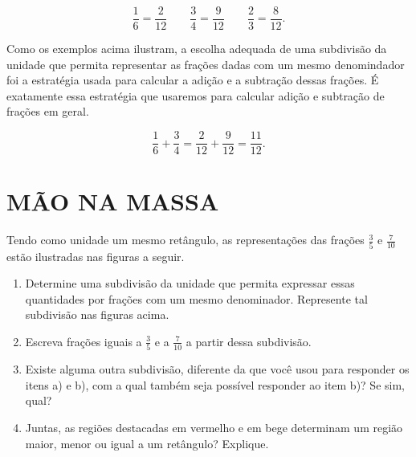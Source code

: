 $$\dfrac{1}{6} = \dfrac{2}{12} 	\quad \quad \dfrac{3}{4} = \dfrac{9}{12} \quad \quad \dfrac{2}{3} = \dfrac{8}{12}.$$


Como os exemplos acima ilustram, a escolha adequada de uma subdivisão da unidade que permita representar as frações dadas com um mesmo denomindador foi a estratégia usada para calcular a adição e a subtração dessas frações. É exatamente essa estratégia que usaremos para calcular adição e subtração de frações em geral.

$$\dfrac{1}{6} + \dfrac{3}{4} = \dfrac{2}{12} + \dfrac{9}{12} = \dfrac{11}{12}.$$


\section{MÃO NA MASSA }

\begin{atividade}{}

Tendo como unidade um mesmo retângulo, as representações das frações $\frac{3}{5}$ e $\frac{7}{10}$ estão ilustradas nas figuras a seguir.

\begin{center}
\end{center}

\begin{enumerate} [\quad a)] %
  \item     Determine uma subdivisão da unidade que permita expressar essas quantidades por frações com um mesmo denominador. Represente tal subdivisão nas figuras acima.
  \item     Escreva frações iguais a     $\frac{3}{5}$     e a     $\frac{7}{10}$     a partir dessa subdivisão.
  \item     Existe alguma outra subdivisão, diferente da que você usou para responder os itens a) e b), com a qual também seja possível responder ao item b)? Se sim, qual?
  \item     Juntas, as regiões destacadas em vermelho e em bege determinam um região maior, menor ou igual a um retângulo? Explique.
\end{enumerate} %
\end{atividade}

